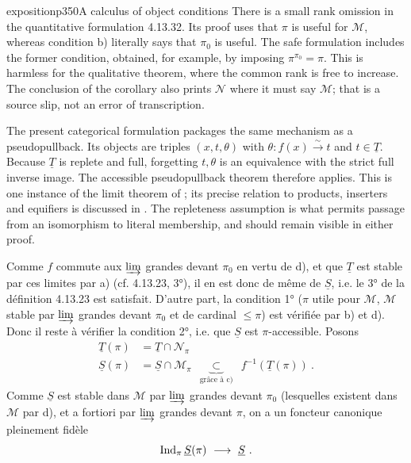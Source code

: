 \begin{dcomment}{exposition}{p350}{A calculus of object conditions}
There is a small rank omission in the quantitative formulation 4.13.32. Its proof uses that $\pi$ is useful for $\mathcal M$, whereas condition b) literally says that $\pi_0$ is useful. The safe formulation includes the former condition, obtained, for example, by imposing $\pi^{\pi_0}=\pi$. This is harmless for the qualitative theorem, where the common rank is free to increase. The conclusion of the corollary also prints $\mathcal N$ where it must say $\mathcal M$; that is a source slip, not an error of transcription.

The present categorical formulation packages the same mechanism as a pseudopullback. Its objects are triples $(x,t,\theta)$ with $\theta:f(x)\xrightarrow{\sim}t$ and $t\in\underline T$. Because $\underline T$ is replete and full, forgetting $t,\theta$ is an equivalence with the strict full inverse image. The accessible pseudopullback theorem therefore applies. This is one instance of the limit theorem of \citet[Theorem 5.1.6]{MakkaiPare1989}; its precise relation to products, inserters and equifiers is discussed in \citet[Introduction and Section 5]{Positselski2024Limits}. The repleteness assumption is what permits passage from an isomorphism to literal membership, and should remain visible in either proof.
\end{dcomment}


Comme $f$ commute aux $\varinjlim$ grandes devant $\pi_0$ en vertu de d), et que $\underline{T}$ est stable par ces limites par a) (cf. 4.13.23, 3°), il en est donc de même de $\underline{S}$, i.e. le 3° de la définition 4.13.23 est satisfait. D'autre part, la condition 1° ($\pi$ utile pour $\mathcal{M}$, $\mathcal{M}$ stable par $\varinjlim$ grandes devant $\pi_0$ et de cardinal $\leqslant\pi$) est vérifiée par b) et d). Donc il reste à vérifier la condition 2°, i.e. que $\underline{S}$ est $\pi$-accessible. Posons
\[
\begin{aligned}
\underline{T}(\pi) &= \underline{T}\cap\mathcal{N}_\pi\\
\underline{S}(\pi) &= \underline{S}\cap\mathcal{M}_\pi\ \ \underbrace{\ \subset\ }_{\text{grâce à c)}}\ \ f^{-1}(\underline{T}(\pi))\ .
\end{aligned}
\]
Comme $\underline{S}$ est stable dans $\mathcal{M}$ par $\varinjlim$ grandes devant $\pi_0$ (lesquelles existent dans $\mathcal{M}$ par d), et a fortiori par $\varinjlim$ grandes devant $\pi$, on a un foncteur canonique pleinement fidèle
\[ \Ind_\pi\underline{S}(\pi)\ \longrightarrow\ \underline{S}\ . \]


